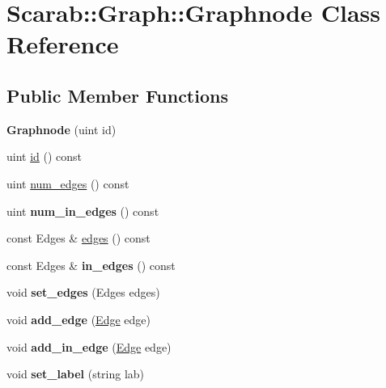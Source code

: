 \hypertarget{classScarab_1_1Graph_1_1Graphnode}{
\section{Scarab::Graph::Graphnode Class Reference}
\label{classScarab_1_1Graph_1_1Graphnode}
}
\subsection*{Public Member Functions}
\begin{DoxyCompactItemize}
\item 
\hypertarget{classScarab_1_1Graph_1_1Graphnode_adce1b3b5b83d8fca4952f244bd093b9f}{
{\bfseries Graphnode} (uint id)}
\label{classScarab_1_1Graph_1_1Graphnode_adce1b3b5b83d8fca4952f244bd093b9f}

\item 
uint \hyperlink{classScarab_1_1Graph_1_1Graphnode_a74eaaed5d31a0a2c0445f3de0859148f}{id} () const 
\item 
uint \hyperlink{classScarab_1_1Graph_1_1Graphnode_a78229cc45113d24f1373a50a13bc7be4}{num\_\-edges} () const 
\item 
\hypertarget{classScarab_1_1Graph_1_1Graphnode_a717294ebbae2d29e9f97633407dae4ce}{
uint {\bfseries num\_\-in\_\-edges} () const }
\label{classScarab_1_1Graph_1_1Graphnode_a717294ebbae2d29e9f97633407dae4ce}

\item 
const Edges \& \hyperlink{classScarab_1_1Graph_1_1Graphnode_a4ffd990052c812242cbdeeae7b0e1104}{edges} () const 
\item 
\hypertarget{classScarab_1_1Graph_1_1Graphnode_a001915a0fd7a6d4b06886f7865fc5189}{
const Edges \& {\bfseries in\_\-edges} () const }
\label{classScarab_1_1Graph_1_1Graphnode_a001915a0fd7a6d4b06886f7865fc5189}

\item 
\hypertarget{classScarab_1_1Graph_1_1Graphnode_ae37c75fd607395376ade1cda5294e2a4}{
void {\bfseries set\_\-edges} (Edges edges)}
\label{classScarab_1_1Graph_1_1Graphnode_ae37c75fd607395376ade1cda5294e2a4}

\item 
\hypertarget{classScarab_1_1Graph_1_1Graphnode_a22e722e5bcd49dcfa643304d631416dc}{
void {\bfseries add\_\-edge} (\hyperlink{classScarab_1_1Graph_1_1Graphedge}{Edge} edge)}
\label{classScarab_1_1Graph_1_1Graphnode_a22e722e5bcd49dcfa643304d631416dc}

\item 
\hypertarget{classScarab_1_1Graph_1_1Graphnode_a092b914639364b7b9168c84e3e556cea}{
void {\bfseries add\_\-in\_\-edge} (\hyperlink{classScarab_1_1Graph_1_1Graphedge}{Edge} edge)}
\label{classScarab_1_1Graph_1_1Graphnode_a092b914639364b7b9168c84e3e556cea}

\item 
\hypertarget{classScarab_1_1Graph_1_1Graphnode_a7ec0926462b47496b1158f16b87e69ca}{
void {\bfseries set\_\-label} (string lab)}
\label{classScarab_1_1Graph_1_1Graphnode_a7ec0926462b47496b1158f16b87e69ca}

\end{DoxyCompactItemize}


